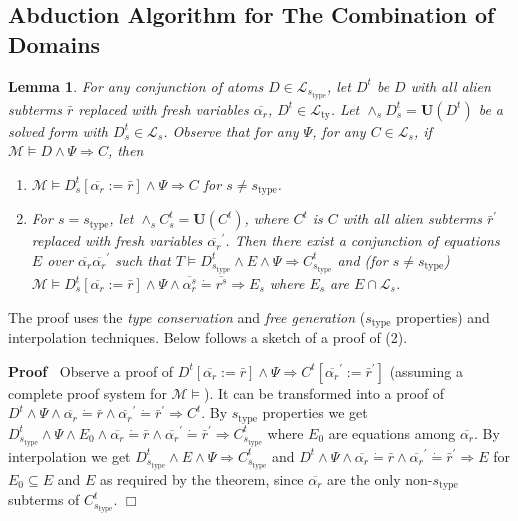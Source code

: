 \documentclass{article}
\newcommand{\assign}{:=}
\newcommand{\tmem}[1]{{\em #1\/}}
\newcommand{\tmmathbf}[1]{\ensuremath{\boldsymbol{#1}}}
\newcommand{\tmop}[1]{\ensuremath{\operatorname{#1}}}
\newenvironment{proof}{\noindent\textbf{Proof\ }}{\hspace*{\fill}$\Box$\medskip}
\newtheorem{lemma}{Lemma}
\begin{document}
\subsection{Abduction Algorithm for The Combination of
Domains}\label{SortCombProof}

\begin{lemma}
  \label{SolvedFormProj}For any conjunction of atoms $D \in
  \mathcal{L}_{s_{\tmop{type}}}$, let $D^t$ be $D$ with all alien subterms
  $\bar{r}$ replaced with fresh variables $\overline{\alpha_r}$, $D^t \in
  \mathcal{L}_{\tmop{ty}}$. Let $\wedge_s D_s^t =\tmmathbf{U} (D^t)$ be a
  solved form with $D_s^t \in \mathcal{L}_s$. Observe that for any $\Psi$, for
  any $C \in \mathcal{L}_s$, if $\mathcal{M} \vDash D \wedge \Psi \Rightarrow
  C$, then
  \begin{enumerate}
    \item $\mathcal{M} \vDash D_s^t [\overline{\alpha_r} \assign \bar{r}]
    \wedge \Psi \Rightarrow C$ for $s \neq s_{\tmop{type}}$.
    
    \item For $s = s_{\tmop{type}}$, let $\wedge_s C_s^t =\tmmathbf{U} (C^t)$,
    where $C^t$ is $C$ with all alien subterms $\bar{r}^{\prime}$ replaced
    with fresh variables $\overline{\alpha_r}^{\prime}$. Then there exist a
    conjunction of equations $E$ over $\overline{\alpha_r}
    \overline{\alpha_r}^{\prime}$ such that $T \vDash D_{s_{\tmop{type}}}^t
    \wedge E \wedge \Psi \Rightarrow C_{s_{\tmop{type}}}^t$ and (for $s \neq
    s_{\tmop{type}}$) $\mathcal{M} \vDash D_s^t [\overline{\alpha_r} \assign
    \bar{r}] \wedge \Psi \wedge \overline{\alpha_r^s} \dot{=} \overline{r^s }
    \Rightarrow E_s$ where $E_s$ are $E \cap \mathcal{L}_s$.
  \end{enumerate}
\end{lemma}

The proof uses the {\tmem{type conservation}} and {\tmem{free generation}}
($s_{\tmop{type}}$ properties) and interpolation techniques. Below follows a
sketch of a proof of (2).

\begin{proof}
  Observe a proof of $D^t [\overline{\alpha_r} \assign \bar{r}] \wedge \Psi
  \Rightarrow C^t [\overline{\alpha_r}^{\prime} \assign \bar{r}^{\prime}]$
  (assuming a complete proof system for $\mathcal{M} \vDash$). It can be
  transformed into a proof of $D^t \wedge \Psi \wedge \overline{\alpha_r}
  \dot{=} \bar{r} \wedge \overline{\alpha_r}^{\prime} \dot{=} \bar{r}^{\prime}
  \Rightarrow C^t$. By $s_{\tmop{type}}$ properties we get
  $D^t_{s_{\tmop{type}}} \wedge \Psi \wedge E_0 \wedge \overline{\alpha_r}
  \dot{=} \bar{r} \wedge \overline{\alpha_r}^{\prime} \dot{=} \bar{r}^{\prime}
  \Rightarrow C^t_{s_{\tmop{type}}}$ where $E_0$ are equations among
  $\overline{\alpha_r}$. By interpolation we get $D_{s_{\tmop{type}}}^t \wedge
  E \wedge \Psi \Rightarrow C_{s_{\tmop{type}}}^t$ and $D^t \wedge \Psi \wedge
  \overline{\alpha_r} \dot{=} \bar{r} \wedge \overline{\alpha_r}^{\prime}
  \dot{=} \bar{r}^{\prime} \Rightarrow E$ for $E_0 \subseteq E$ and $E$ as
  required by the theorem, since $\overline{\alpha_r}$ are the only
  non-$s_{\tmop{type}}$ subterms of $C^t_{s_{\tmop{type}}}$.
\end{proof}
\end{document}
